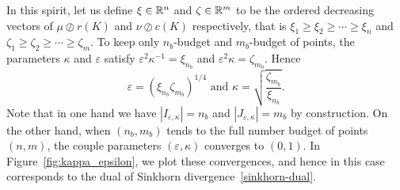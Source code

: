 In this spirit, let us define $\xi \in {\mathbb{R}}^n$ and $\zeta \in {\mathbb{R}}^m$ to be the ordered decreasing vectors of $\mu \oslash r(K)$ and $\nu \oslash c(K)$ respectively, that is $\xi_1 \geq \xi_2 \geq \cdots \geq \xi_n$ and $\zeta_1 \geq \zeta_2 \geq \cdots \geq \zeta_m$.
To keep only $n_b$-budget and $m_b$-budget of points, the parameters $\kappa$ and $\varepsilon$ satisfy ${\varepsilon^2}\kappa^{-1} = \xi_{n_b}$ and $\varepsilon^2\kappa = \zeta_{m_b}$. Hence 
\begin{equation}
\label{epsilon_kappa}
 \varepsilon = (\xi_{n_b}\zeta_{m_b})^{1/4} \text{ and } \kappa = \sqrt{\frac{\zeta_{m_b}}{\xi_{n_b}}}.
\end{equation}
Note that in one hand we have $|I_{\varepsilon, \kappa}| = n_b$ and $|J_{\varepsilon, \kappa}| = m_b$ by construction. On the other hand, when $(n_b,m_b)$ tends to the full number budget of points $(n,m)$, the couple parameters $(\varepsilon, \kappa)$ converges to $(0,1)$. 
In Figure~\ref{fig:kappa_epsilon}, we plot these convergences, and hence in this case corresponds to the dual of Sinkhorn divergence~\eqref{sinkhorn-dual}.


